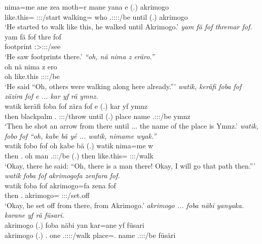 \begin{exe}
	\gll nima=me ane zea moth=r mane yana e (.) akrimogo\\ 
	like.this=\Ins{} \Dem{} \Sg:\Sbj:\Pst:\Pfv/start walking=\Purp{} who \Tsg.\Masc:\Sbj:\Pst:\Ipfv:\Venit/be until (.) akrimogo\\
	\trans `He started to walk like this, he walked until Akrimogo.'
	\emph{yam fä fof thremar fof.}\\
	\gll yam fä fof thre fof\\ 
	footprint \Dist{} \Emph{} \Stsg:\Sbj>\Stpl:\Obj:\Irr:\Pfv/see \Emph{}\\
	\trans `He saw footprints there.'
	\emph{``oh, nä nima z eräro.''}\\
	\gll oh nä nima z ero\\ 
	oh \Indf{} like.this \Iam{} \Stpl:\Sbj:\Nonpast:\Ipfv:\Andat/be\\
	\trans `He said ``Oh, others were walking along here already.'''
	\emph{watik, keräfi foba fof zäzira fof e ... kar yf rä ymnz.}\\
	\gll watik keräfi foba fof zära fof e (.) kar yf  ymnz\\ 
	then blackpalm \Dist.\Abl{} \Emph{} \Sg:\Sbj:\Pst:\Pfv/throw \Emph{} until (.) place name \Tsg.\F:\Sbj:\Nonpast:\Ipfv/be ymnz\\
	\trans `Then he shot an arrow from there until ... the name of the place is Ymnz.'
	\emph{watik, fobo fof ``oh, kabe bä yé ... watik, nimame wyak.''}\\
	\gll watik fobo fof oh kabe bä  (.) watik nima=me w\\ 
	then \Dist.\All{} \Emph{} oh man \Med{} \Tsg.\Masc:\Sbj:\Nonpast:\Ipfv/be (.) then like.this=\Ins{} \Fsg:\Fsg:\Nonpast:\Ipfv/walk\\
	\trans `Okay, there he said: ``Oh, there is a man there! Okay, I will go that path then.'''
	\emph{watik foba fof akrimogofa zenfara fof.}\\
	\gll watik foba fof akrimogo=fa zena fof\\ 
	then \Dist.\Abl{} \Emph{} akrimogo=\Abl{} \Sg:\Sbj:\Pst:\Pfv/set.off \Emph{}\\
	\trans `Okay, he set off from there, from Akrimogo.'
	\emph{akrimogo ... foba näbi yanyaka. karane yf rä füsari.}\\
	\gll akrimogo (.) foba näbi yan kar=ane yf  füsari\\ 
	akrimogo (.) \Dist.\Abl{} one \Tsg.\Masc:\Sbj:\Pst:\Ipfv:\Venit/walk place=\Poss.\Sg{} name \Tsg.\F:\Sbj:\Nonpast:\Ipfv/be füsäri\\

\end{exe}
